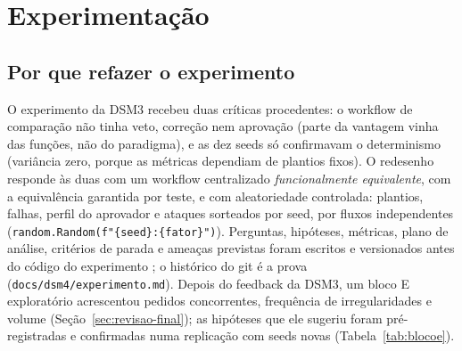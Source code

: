 \documentclass[10pt,a4paper]{article}
\newcommand{\code}[1]{\texttt{#1}}
\begin{document}
\section{Experimentação}\label{sec:exp}
\subsection{Por que refazer o experimento}
O experimento da DSM3 recebeu duas críticas procedentes: o workflow de comparação não tinha veto, correção nem
aprovação (parte da vantagem vinha das funções, não do paradigma), e as dez seeds só confirmavam o determinismo
(variância zero, porque as métricas dependiam de plantios fixos). O redesenho responde às duas com um workflow
centralizado \emph{funcionalmente equivalente}, com a equivalência garantida por teste, e com aleatoriedade controlada:
plantios, falhas, perfil do aprovador e ataques sorteados por seed, por fluxos independentes
(\code{random.Random(f"\{seed\}:\{fator\}")}). Perguntas, hipóteses, métricas, plano de análise, critérios de parada e
ameaças previstas foram escritos e versionados antes do código do experimento \parencite{nosek2018}; o histórico do
git é a prova (\code{docs/dsm4/experimento.md}). Depois do feedback da DSM3, um bloco E exploratório acrescentou pedidos
concorrentes, frequência de irregularidades e volume (Seção~\ref{sec:revisao-final}); as hipóteses que ele sugeriu
foram pré-registradas e confirmadas numa replicação com seeds novas (Tabela~\ref{tab:blocoe}).
\end{document}
